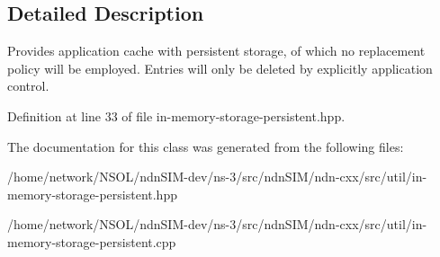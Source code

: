\subsection{Detailed Description}
Provides application cache with persistent storage, of which no replacement policy will be employed. Entries will only be deleted by explicitly application control. 

Definition at line 33 of file in-\/memory-\/storage-\/persistent.\+hpp.



The documentation for this class was generated from the following files\+:\begin{DoxyCompactItemize}
\item 
/home/network/\+N\+S\+O\+L/ndn\+S\+I\+M-\/dev/ns-\/3/src/ndn\+S\+I\+M/ndn-\/cxx/src/util/in-\/memory-\/storage-\/persistent.\+hpp\item 
/home/network/\+N\+S\+O\+L/ndn\+S\+I\+M-\/dev/ns-\/3/src/ndn\+S\+I\+M/ndn-\/cxx/src/util/in-\/memory-\/storage-\/persistent.\+cpp\end{DoxyCompactItemize}
